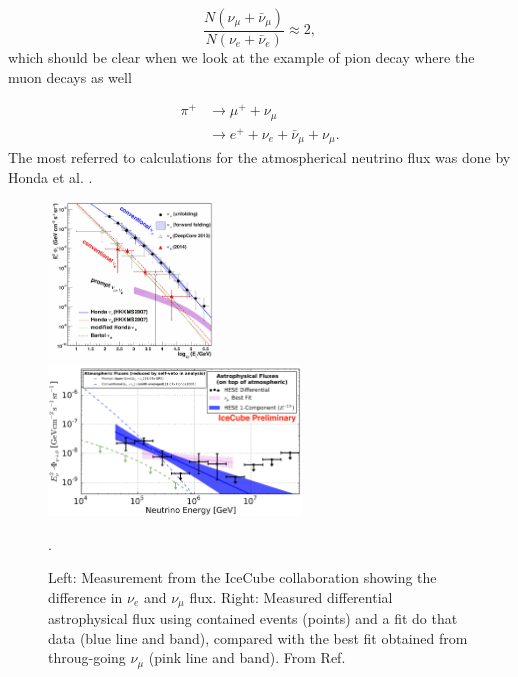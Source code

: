\begin{equation}
\frac{N\left( \nu_\mu + \bar{\nu}_\mu\right) }{N\left(\nu_e + \bar{\nu}_e\right)} \approx 2,
\end{equation}
which should be clear when we look at the example of pion decay where the muon decays as well

\begin{align}
\pi^+ &\rightarrow \mu^+ + \nu_\mu \\
& \rightarrow e^+ + \nu_e + \bar{\nu}_\mu + \nu_\mu.
\end{align}
The most referred to calculations for the atmospherical neutrino flux was done by Honda et al. \cite{Honda:2006qj}.
\begin{figure}[t]
\label{fig:neutrinospectrum2}
\centering
\includegraphics[width=0.39\textwidth]{chapter3/img/neutrinospectrum2.png}
\includegraphics[width=0.6\textwidth]{chapter3/img/astroflux.png}
\caption{Left: Measurement from the IceCube collaboration showing the difference in $\nu_e$ and $\nu_\mu$ flux. Right: Measured differential astrophysical flux using contained events (points) and a fit do that data (blue line and band), compared with the best fit obtained from throug-going $\nu_\mu$ (pink line and band). From Ref. \cite{Aartsen:2017mau}}.
\end{figure}

